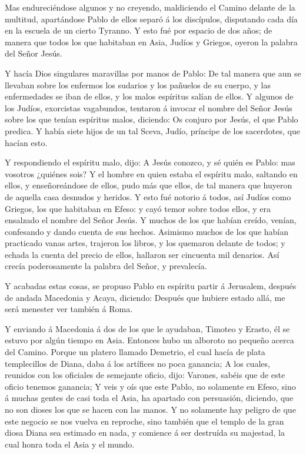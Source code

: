  Mas endureciéndose algunos y no creyendo, maldiciendo el
Camino delante de la multitud, apartándose Pablo de ellos separó á los
discípulos, disputando cada día en la escuela de un cierto Tyranno.
 Y esto fué por espacio de dos años; de manera que todos
los que habitaban en Asia, Judíos y Griegos, oyeron la palabra del Señor
Jesús.

 Y hacía Dios singulares maravillas por manos de Pablo:
 De tal manera que aun se llevaban sobre los enfermos los
sudarios y los pañuelos de su cuerpo, y las enfermedades se iban de
ellos, y los malos espíritus salían de ellos.  Y algunos de
los Judíos, exorcistas vagabundos, tentaron á invocar el nombre del
Señor Jesús sobre los que tenían espíritus malos, diciendo: Os conjuro
por Jesús, el que Pablo predica.  Y había siete hijos de un
tal Sceva, Judío, príncipe de los sacerdotes, que hacían esto.

 Y respondiendo el espíritu malo, dijo: A Jesús conozco, y
sé quién es Pablo: mas vosotros ¿quiénes sois?  Y el hombre
en quien estaba el espíritu malo, saltando en ellos, y enseñoreándose de
ellos, pudo más que ellos, de tal manera que huyeron de aquella casa
desnudos y heridos.  Y esto fué notorio á todos, así Judíos
como Griegos, los que habitaban en Efeso: y cayó temor sobre todos
ellos, y era ensalzado el nombre del Señor Jesús.  Y muchos
de los que habían creído, venían, confesando y dando cuenta de sus
hechos.  Asimismo muchos de los que habían practicado vanas
artes, trajeron los libros, y los quemaron delante de todos; y echada la
cuenta del precio de ellos, hallaron ser cincuenta mil denarios.
 Así crecía poderosamente la palabra del Señor, y
prevalecía.

 Y acabadas estas cosas, se propuso Pablo en espíritu
partir á Jerusalem, después de andada Macedonia y Acaya, diciendo:
Después que hubiere estado allá, me será menester ver también á Roma.

 Y enviando á Macedonia á dos de los que le ayudaban,
Timoteo y Erasto, él se estuvo por algún tiempo en Asia. 
Entonces hubo un alboroto no pequeño acerca del Camino. 
Porque un platero llamado Demetrio, el cual hacía de plata templecillos
de Diana, daba á los artífices no poca ganancia;  A los
cuales, reunidos con los oficiales de semejante oficio, dijo: Varones,
sabéis que de este oficio tenemos ganancia;  Y veis y oís
que este Pablo, no solamente en Efeso, sino á muchas gentes de casi toda
el Asia, ha apartado con persuasión, diciendo, que no son dioses los que
se hacen con las manos.  Y no solamente hay peligro de que
este negocio se nos vuelva en reproche, sino también que el templo de la
gran diosa Diana sea estimado en nada, y comience á ser destruída su
majestad, la cual honra toda el Asia y el mundo.

